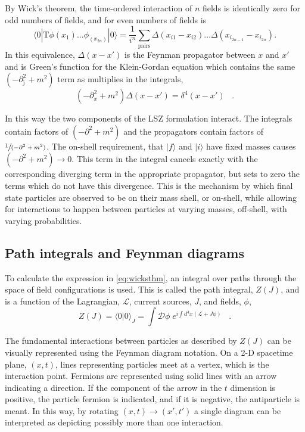  By Wick's theorem, the time-ordered interaction of $n$ fields
  is identically zero for odd numbers of fields, and for even numbers
  of fields is 
\begin{equation}\label{eq:wicksthm}
 \langle 0 | \mathrm{T} \phi(x_1)\dots \phi_(x_{2n}) | 0 \rangle
  = \frac{1}{i^n}\sum_{\mathrm{pairs}}\Delta(x_{i1}-x_{i2})\dots\Delta(x_{i_{2n-1}}-x_{i_{2n}}).
\end{equation}
 In this equivalence, $\Delta(x-x')$ is the 
  Feynman propagator between $x$ and $x'$
  and is Green's function for
  the Klein-Gordan equation
  which contains the same $(-\partial^2_\mathrm{j} + m^2)$ 
  term as multiplies in the integrals,
\begin{equation}\label{eq:feynprop}
 \left(-\partial_x^2 + m^2\right)\Delta(x-x') = \delta^4(x-x')\;\;\;.
\end{equation}

 In this way the two components of the LSZ
  formulation interact. 
 The integrals contain factors of $(-\partial^2+m^2)$
  and the propagators contain factors
  of $\sfrac{1}{(-\partial^2+m^2)}$.
 The on-shell requirement, that
  $| f \rangle$ and $| i \rangle$ 
  have fixed masses causes $(-\partial^2+m^2)\rightarrow 0$.
 This term in the integral  cancels exactly with the 
  corresponding diverging term in the
  appropriate  propagator, 
  but  sets to zero the terms which do not have 
  this divergence.
 This is the mechanism by which final
  state particles are observed to be
  on their mass shell, or on-shell,
  while allowing for interactions
  to happen between particles at
  varying masses, off-shell,
  with varying probabilities.
  
\subsection{Path integrals and Feynman diagrams}\label{sec:PIandFD}

 To calculate the expression in \ref{eq:wicksthm},
  an integral over paths through the 
  space of field configurations is used.
 This is called the path integral, $Z(J)$,
  and  is a function of 
  the Lagrangian, $\mathcal{L}$, 
  current sources, $J$, and fields, $\phi$,
\begin{equation}\label{eq:pathintegral}
Z(J) = \langle 0 | 0 \rangle_J = \int \mathcal{D}\phi
       \;e^{ i \int d^4x \left(\mathcal{L}+J\phi \right)}\;\;\;.
\end{equation}

 The fundamental interactions between particles 
  as described by $Z(J)$ 
  can be visually represented using the Feynman
  diagram notation. 
 On a 2-D spacetime plane, $(x,t)$,
  lines representing particles meet
  at a vertex, which is the interaction point.
 Fermions are represented using solid lines
  with an arrow indicating a direction.
 If the component of the arrow in the $t$
  dimension is positive, the particle 
  fermion is indicated, and if it is 
  negative, the antiparticle is meant.
 In this way, by rotating $(x,t)\rightarrow (x',t')$
  a single diagram can be interpreted as 
  depicting possibly more than one interaction.


